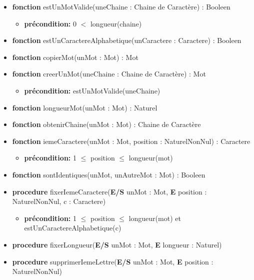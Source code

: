 	\begin{itemize}[label=$\ $, leftmargin=1cm]
		 \item \textbf{fonction} estUnMotValide(uneChaine : Chaine de Caractère) : Booleen
		 \begin{itemize}[label=$| $]
            \item \textbf{précondition:} 0 $<$ longueur(chaine)
         \end{itemize}
		 \item \textbf{fonction} estUnCaractereAlphabetique(unCaractere : Caractere) : Booleen
		 \item \textbf{fonction} copierMot(unMot : Mot) : Mot
		 \item \textbf{fonction} creerUnMot(uneChaine : Chaine de Caractère) : Mot
		 \begin{itemize}[label=$| $]
            \item \textbf{précondition:} estUnMotValide(uneChaine)
         \end{itemize}
		 \item \textbf{fonction} longueurMot(unMot : Mot) : Naturel
		 \item \textbf{fonction} obtenirChaine(unMot : Mot) : Chaine de Caractère
		 \item \textbf{fonction} iemeCaractere(unMot : Mot, position : NaturelNonNul) : Caractere
		 \begin{itemize}[label=$| $]
            \item \textbf{précondition:} 1 $\leq$ position $\leq$ longueur(mot)
         \end{itemize}
         \item \textbf{fonction} sontIdentiques(unMot, unAutreMot : Mot) : Booleen
         \item \textbf{procedure} fixerIemeCaractere(\textbf{E/S} unMot : Mot, \textbf{E} position : NaturelNonNul, c : Caractere)
         \begin{itemize}[label=$| $]
            \item \textbf{précondition:} 1 $\leq$ position $\leq$ longueur(mot) et estUnCaractereAlphabetique(c)
         \end{itemize}
         \item \textbf{procedure} fixerLongueur(\textbf{E/S} unMot : Mot, \textbf{E} longueur : Naturel)
         \item \textbf{procedure} supprimerIemeLettre(\textbf{E/S} unMot : Mot, \textbf{E} position : NaturelNonNul)
         \begin{itemize}[label=$| $]

\end{itemize}
\end{itemize}
